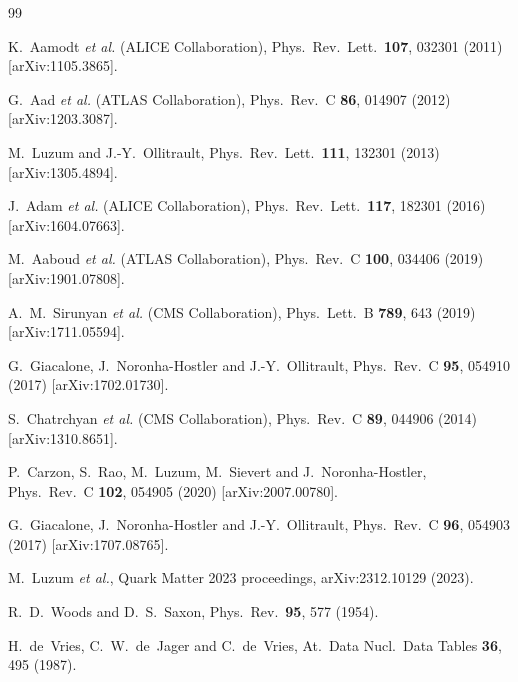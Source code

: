 \documentclass[12pt,a4paper,twoside]{report}
\begin{document}
\begin{thebibliography}{99}

  K.~Aamodt \textit{et al.} (ALICE Collaboration),
  Phys.\ Rev.\ Lett.\ \textbf{107}, 032301 (2011)
  [arXiv:1105.3865].

  G.~Aad \textit{et al.} (ATLAS Collaboration),
  Phys.\ Rev.\ C \textbf{86}, 014907 (2012)
  [arXiv:1203.3087].

  M.~Luzum and J.-Y.~Ollitrault,
  Phys.\ Rev.\ Lett.\ \textbf{111}, 132301 (2013)
  [arXiv:1305.4894].

  J.~Adam \textit{et al.} (ALICE Collaboration),
  Phys.\ Rev.\ Lett.\ \textbf{117}, 182301 (2016)
  [arXiv:1604.07663].

  M.~Aaboud \textit{et al.} (ATLAS Collaboration),
  Phys.\ Rev.\ C \textbf{100}, 034406 (2019)
  [arXiv:1901.07808].

  A.~M.~Sirunyan \textit{et al.} (CMS Collaboration),
  Phys.\ Lett.\ B \textbf{789}, 643 (2019)
  [arXiv:1711.05594].

  G.~Giacalone, J.~Noronha-Hostler and J.-Y.~Ollitrault,
  Phys.\ Rev.\ C \textbf{95}, 054910 (2017)
  [arXiv:1702.01730].

  S.~Chatrchyan \textit{et al.} (CMS Collaboration),
  Phys.\ Rev.\ C \textbf{89}, 044906 (2014)
  [arXiv:1310.8651].

  P.~Carzon, S.~Rao, M.~Luzum, M.~Sievert and J.~Noronha-Hostler,
  Phys.\ Rev.\ C \textbf{102}, 054905 (2020)
  [arXiv:2007.00780].

  G.~Giacalone, J.~Noronha-Hostler and J.-Y.~Ollitrault,
  Phys.\ Rev.\ C \textbf{96}, 054903 (2017)
  [arXiv:1707.08765].

  M.~Luzum \textit{et al.},
  Quark Matter 2023 proceedings,
  arXiv:2312.10129 (2023).

  R.~D.~Woods and D.~S.~Saxon,
  Phys.\ Rev.\ \textbf{95}, 577 (1954).

  H.~de~Vries, C.~W.~de~Jager and C.~de~Vries,
  At.\ Data Nucl.\ Data Tables \textbf{36}, 495 (1987).


\end{thebibliography}
\end{document}
